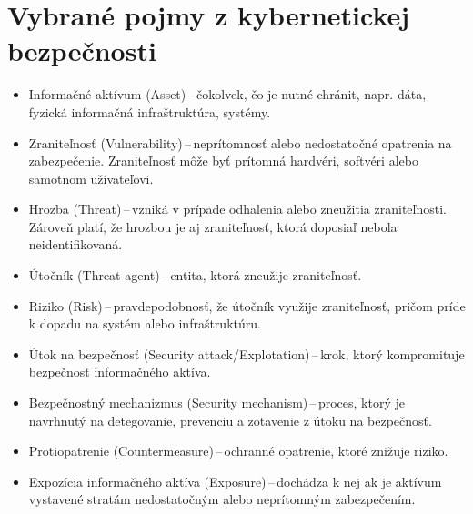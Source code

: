 \section{Vybrané pojmy z kybernetickej bezpečnosti}
\begin{itemize}
	\item Informačné aktívum (Asset)\,--\,čokolvek, čo je nutné chránit, napr. dáta, fyzická informačná infraštruktúra, systémy\cite{McMillan2018}.\\
	
	\item Zraniteľnosť (Vulnerability)\,--\,neprítomnosť alebo nedostatočné opatrenia na zabezpečenie. Zraniteľnosť môže byť prítomná hardvéri, softvéri alebo samotnom užívateľovi\cite{McMillan2018}.\\
	
	\item Hrozba (Threat)\,--\,vzniká v prípade odhalenia alebo zneužitia zraniteľnosti. Zároveň platí, že hrozbou je aj zraniteľnosť, ktorá doposiaľ nebola neidentifikovaná\cite{McMillan2018}.\\
	
	\item Útočník (Threat agent)\,--\,entita, ktorá zneužije zraniteľnosť\cite{McMillan2018}.\\
    
    \item Riziko (Risk)\,--\,pravdepodobnosť, že útočník využije zraniteľnosť, pričom príde k dopadu na systém alebo infraštruktúru\cite{McMillan2018}.\\
  	
  	\item Útok na bezpečnosť (Security attack/Explotation)\,--\,krok, ktorý kompromituje bezpečnosť informačného aktíva\cite{Vyncke2008}.\\
  	    
	\item Bezpečnostný mechanizmus (Security mechanism)\,--\,proces, ktorý je navrhnutý na detegovanie, prevenciu a zotavenie z útoku na bezpečnosť. \\
	
	\item Protiopatrenie (Countermeasure)\,--\,ochranné opatrenie, ktoré znižuje riziko\cite{McMillan2018}.\\
	
	\item Expozícia informačného aktíva (Exposure)\,--\,dochádza k nej ak je aktívum vystavené stratám nedostatočným alebo neprítomným zabezpečením\cite{McMillan2018}.\\
	
\end{itemize}


